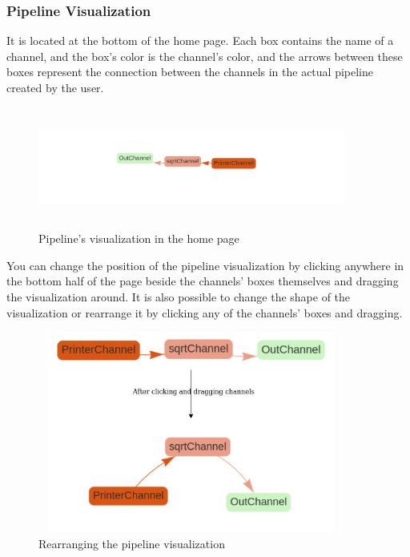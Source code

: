 \subsubsection{Pipeline Visualization}\label{sec:pipeline_vis}
It is located at the bottom of the home page. Each box contains the name of a channel, and the box's color is the
channel's color, and the arrows between these boxes represent the connection between the channels in the
actual pipeline created by the user.
\newline
\begin{figure}[H]
	\centering
	\includegraphics[width=0.9\textwidth,height=150px]{images/pipeline_viz.png}
	\caption{Pipeline's visualization in the home page}
	\label{fig:pipeline_viz_home_page}
\end{figure}

You can change the position of the pipeline visualization by clicking anywhere in the bottom half of the page
beside the channels' boxes themselves and dragging the visualization around. It is also possible to change the 
shape of the visualization or rearrange it by clicking any of the channels' boxes and dragging.
\newline
\begin{figure}[H]
	\centering
	\includegraphics[width=0.9\textwidth,height=250px]{images/moving_viz_graph.jpg}
	\caption{Rearranging the pipeline visualization}
	\label{fig:remving_channel_graph}
\end{figure}

